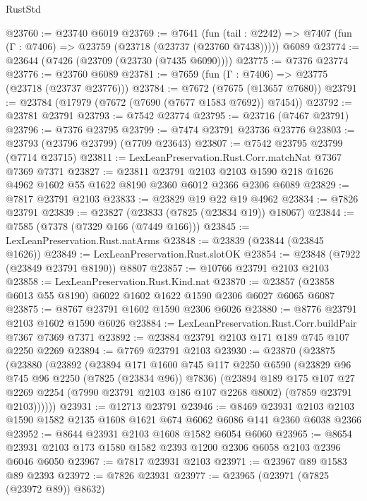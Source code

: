 \begin{lexlean}{RustStd}
\begin{coremodule}
@23760 := @23740 @6019
@23769 := @7641
    (fun (tail : @2242) => @7407 (fun (Γ : @7406) => @23759 (@23718 (@23737 (@23760 @7438)))))
    @6089
@23774 := @23644 (@7426 (@23709 (@23730 (@7435 @6090))))
@23775 := @7376 @23774
@23776 := @23760 @6089
@23781 := @7659 (fun (Γ : @7406) => @23775 (@23718 (@23737 @23776)))
@23784 := @7672 (@7675 (@13657 @7680))
@23791 := @23784 (@17979 (@7672 (@7690 (@7677 @1583 @7692)) @7454))
@23792 := @23781 @23791
@23793 := @7542 @23774
@23795 := @23716 (@7467 @23791)
@23796 := @7376 @23795
@23799 := @7474 @23791 @23736 @23776
@23803 := @23793 (@23796 @23799) (@7709 @23643)
@23807 := @7542 @23795 @23799 (@7714 @23715)
@23811 := LexLeanPreservation.Rust.Corr.matchNat @7367 @7369 @7371
@23827 := @23811
    @23791
    @2103
    @2103
    @1590
    @218
    @1626
    @4962
    @1602
    @55
    @1622
    @8190
    @2360
    @6012
    @2366
    @2306
    @6089
@23829 := @7817 @23791 @2103
@23833 := @23829 @19 @22 @19 @4962
@23834 := @7826 @23791
@23839 := @23827 (@23833 (@7825 (@23834 @19)) @18067)
@23844 := @7585 (@7378 (@7329 @166 (@7449 @166)))
@23845 := LexLeanPreservation.Rust.natArms
@23848 := @23839 (@23844 (@23845 @1626))
@23849 := LexLeanPreservation.Rust.slotOK
@23854 := @23848 (@7922 (@23849 @23791 @8190)) @8807
@23857 := @10766 @23791 @2103 @2103
@23858 := LexLeanPreservation.Rust.Kind.nat
@23870 := @23857 (@23858 @6013 @55 @8190) @6022 @1602 @1622 @1590 @2306 @6027 @6065 @6087
@23875 := @8767 @23791 @1602 @1590 @2306 @6026
@23880 := @8776 @23791 @2103 @1602 @1590 @6026
@23884 := LexLeanPreservation.Rust.Corr.buildPair @7367 @7369 @7371
@23892 := @23884 @23791 @2103 @171 @189 @745 @107 @2250 @2269
@23894 := @7769 @23791 @2103
@23930 := @23870
    (@23875
      (@23880
        (@23892
          (@23894
            @171
            @1600
            @745
            @117
            @2250
            @6590
            (@23829 @96 @745 @96 @2250 (@7825 (@23834 @96)) @7836)
            (@23894
              @189
              @175
              @107
              @27
              @2269
              @2254
              (@7990 @23791 @2103 @186 @107 @2268 @8002)
              (@7859 @23791 @2103))))))
@23931 := @12713 @23791
@23946 := @8469
    @23931
    @2103
    @2103
    @1590
    @1582
    @2135
    @1608
    @1621
    @674
    @6062
    @6086
    @141
    @2360
    @6038
    @2366
@23952 := @8644 @23931 @2103 @1608 @1582 @6054 @6060
@23965 := @8654 @23931 @2103 @173 @1580 @1582 @2393 @1200 @2306 @6058 @2103 @2396 @6046 @6050
@23967 := @7817 @23931 @2103
@23971 := @23967 @89 @1583 @89 @2393
@23972 := @7826 @23931
@23977 := @23965 (@23971 (@7825 (@23972 @89)) @8632)

\end{coremodule}
\end{lexlean}
